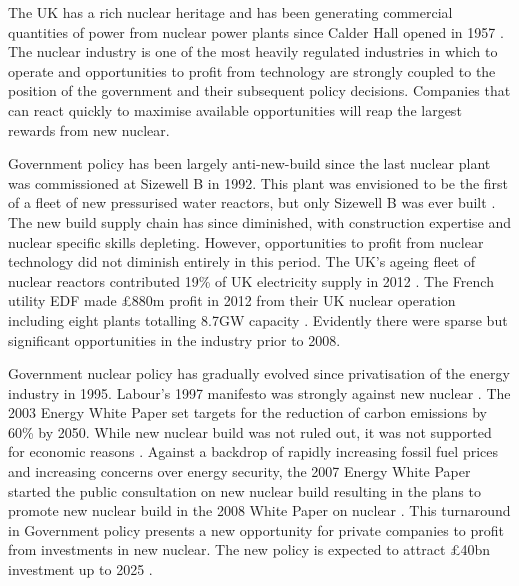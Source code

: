 {}

The UK has a rich nuclear heritage and has been generating commercial quantities of power from nuclear power plants since Calder Hall opened in 1957 \cite{NDA2007}. 
The nuclear industry is one of the most heavily regulated industries in which to operate and opportunities to profit from technology are strongly coupled to the position of the government and their subsequent policy decisions. 
Companies that can react quickly to maximise available opportunities will reap the largest rewards from new nuclear.

Government policy has been largely anti-new-build since the last nuclear plant was commissioned at Sizewell B in 1992. 
This plant was envisioned to be the first of a fleet of new pressurised water reactors, but only Sizewell B was ever built \cite{WNA2014}. 
The new build supply chain has since diminished, with construction expertise and nuclear specific skills depleting.
However, opportunities to profit from nuclear technology did not diminish entirely in this period. 
The UK's ageing fleet of nuclear reactors contributed 19\% of UK electricity supply in 2012 \cite{WNA2014}.  
The French utility EDF made \pounds880m profit in 2012 from their UK nuclear operation including eight plants totalling 8.7GW capacity \cite{EDF2012}. 
Evidently there were sparse but significant opportunities in the industry prior to 2008.

Government nuclear policy has gradually evolved since privatisation of the energy industry in 1995. 
Labour’s 1997 manifesto was strongly against new nuclear \cite{Birmingham2012}. 
The 2003 Energy White Paper set targets for the reduction of carbon emissions by 60\% by 2050. 
While new nuclear build was not ruled out, it was not supported for economic reasons \cite{WP2003}. 
Against a backdrop of rapidly increasing fossil fuel prices and increasing concerns over energy security, the 2007 Energy White Paper started the public consultation on new nuclear build \cite{WP2007} resulting in the plans to promote new nuclear build in the 2008 White Paper on nuclear \cite{WP2008}.
This turnaround in Government policy presents a new opportunity for private companies to profit from investments in new nuclear. 
The new policy is expected to attract \pounds40bn investment up to 2025 \cite{Birmingham2012}.

